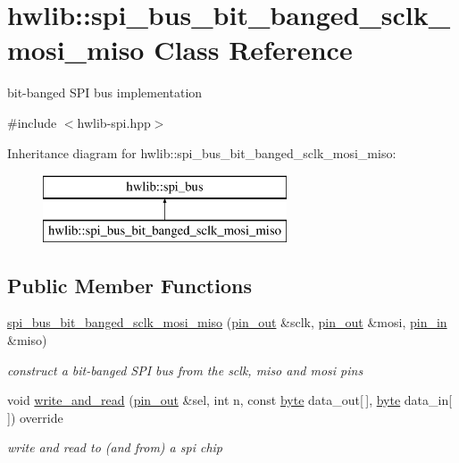 \hypertarget{classhwlib_1_1spi__bus__bit__banged__sclk__mosi__miso}{}\section{hwlib\+:\+:spi\+\_\+bus\+\_\+bit\+\_\+banged\+\_\+sclk\+\_\+mosi\+\_\+miso Class Reference}
\label{classhwlib_1_1spi__bus__bit__banged__sclk__mosi__miso}


bit-\/banged S\+PI bus implementation  




{\ttfamily \#include $<$hwlib-\/spi.\+hpp$>$}

Inheritance diagram for hwlib\+:\+:spi\+\_\+bus\+\_\+bit\+\_\+banged\+\_\+sclk\+\_\+mosi\+\_\+miso\+:\begin{figure}[H]
\begin{center}
\leavevmode
\includegraphics[height=2.000000cm]{classhwlib_1_1spi__bus__bit__banged__sclk__mosi__miso}
\end{center}
\end{figure}
\subsection*{Public Member Functions}
\begin{DoxyCompactItemize}
\item 
\hyperlink{classhwlib_1_1spi__bus__bit__banged__sclk__mosi__miso_aec1da306136cb0bb367dd47470f551da}{spi\+\_\+bus\+\_\+bit\+\_\+banged\+\_\+sclk\+\_\+mosi\+\_\+miso} (\hyperlink{classhwlib_1_1pin__out}{pin\+\_\+out} \&sclk, \hyperlink{classhwlib_1_1pin__out}{pin\+\_\+out} \&mosi, \hyperlink{classhwlib_1_1pin__in}{pin\+\_\+in} \&miso)
\begin{DoxyCompactList}\small\item\em construct a bit-\/banged S\+PI bus from the sclk, miso and mosi pins \end{DoxyCompactList}\item 
void \hyperlink{classhwlib_1_1spi__bus__bit__banged__sclk__mosi__miso_aa54c0f670505249860f59d8d62b982ca}{write\+\_\+and\+\_\+read} (\hyperlink{classhwlib_1_1pin__out}{pin\+\_\+out} \&sel, int n, const \hyperlink{hwlib-defines_8hpp_ab8ef12fab634c171394422d0ee8baf94}{byte} data\+\_\+out\mbox{[}$\,$\mbox{]}, \hyperlink{hwlib-defines_8hpp_ab8ef12fab634c171394422d0ee8baf94}{byte} data\+\_\+in\mbox{[}$\,$\mbox{]}) override
\begin{DoxyCompactList}\small\item\em write and read to (and from) a spi chip \end{DoxyCompactList}\end{DoxyCompactItemize}


